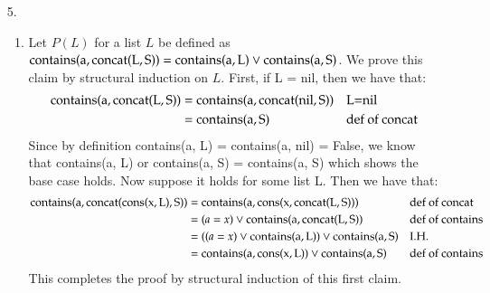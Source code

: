 \documentclass[12pt]{article}
\theoremstyle{definitionstyle}
\begin{document}
\begin{enumerate}[labelindent=0pt, labelwidth=!, wide]
            \newpage
            \item[5.] \begin{enumerate}[leftmargin=0pt, label=(\alph*), labelindent=0pt, labelwidth=!, wide]
                \item Let $P(L)$ for a list $L$ be defined as $\rm contains(a, concat(L, S)) = \rm contains(a, L) \lor contains(a, S)$. We prove this claim by structural induction on $L$. First, if L = nil, then we have that:
                \begin{align*}
                    \begin{aligned}
                        \rm contains(a, concat(L, S)) &= \rm contains(a, concat(nil, S)) && \text{L=nil} \\
                        &= \rm contains(a, S) && \text{def of concat} \\
                    \end{aligned}
                \end{align*}
                Since by definition contains(a, L) = contains(a, nil) = False, we know that contains(a, L) or contains(a, S) = contains(a, S) which shows the base case holds. Now suppose it holds for some list L. Then we have that:
                \begin{align*}
                    \begin{aligned}
                        \rm contains(a, concat(cons(x, L), S)) &= \rm contains(a, cons(x, concat(L, S))) && \text{def of concat} \\
                        &= (a=x) \rm \lor \rm contains(a, concat(L, S)) && \text{def of contains} \\
                        &= ((a=x) \rm \lor \rm contains(a, L)) \rm \lor \rm contains(a, S) && \text{I.H.} \\
                        &= \rm contains(a, cons(x, L)) \rm \lor \rm contains(a, S) && \text{def of contains} 
                    \end{aligned}
                \end{align*}
                This completes the proof by structural induction of this first claim.


\end{enumerate}
\end{enumerate}
\end{document}
